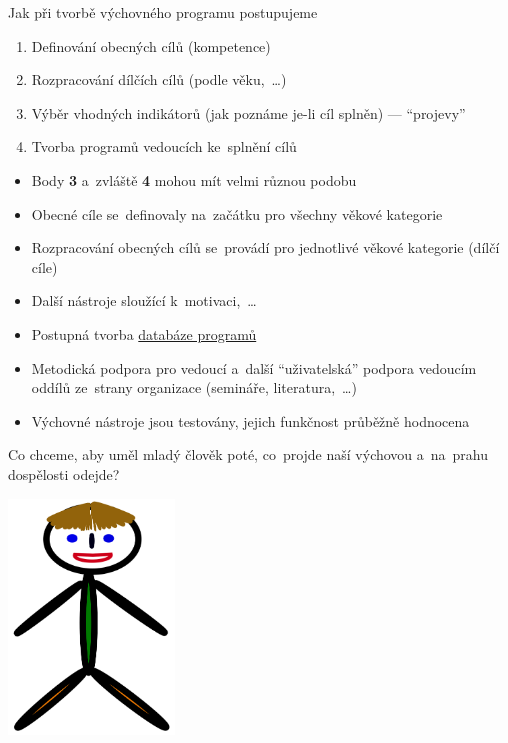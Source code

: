 \documentclass[compress, ucs, xelatex, 11pt, xcolor=dvipsnames, print, aspectratio=169,
	hyperref={
		bookmarks=true,
		unicode=true,
		colorlinks=true,
		pdftitle={Skautska vychovna metoda},
		plainpages=false,
		pdfauthor={Vojtech Zeisek},
		pdfsubject={Skautska vychovna metoda a jeji vyvoj za posledni stoleti a desetileti},
		pdfcreator={XeLaTeX},
		pdfkeywords={Junak, Pedagogika, Skaut, Skauting, Vychovna metoda},
		linkcolor=Red, %
		anchorcolor=ForestGreen, %
		citecolor=ForestGreen, %
		filecolor=ForestGreen, %
		menucolor=ForestGreen, %
		urlcolor=Sepia, %
		pdftex},
	url={hyphens, lowtilde} %
	]{beamer}
\begin{document}
\begin{frame}{Jak při tvorbě výchovného programu postupujeme}
	\begin{enumerate}
		\item Definování obecných cílů (kompetence)
		\item Rozpracování dílčích cílů (podle věku,~\ldots)
		\item Výběr vhodných indikátorů (jak poznáme je-li cíl splněn) --- \enquote{projevy}
		\item Tvorba programů vedoucích ke~splnění cílů
	\end{enumerate}
	\begin{itemize}
		\item Body \textbf{3} a~zvláště \textbf{4} mohou mít velmi různou podobu
		\item Obecné cíle se~definovaly na~začátku pro všechny věkové kategorie
		\item Rozpracování obecných cílů se~provádí pro jednotlivé věkové kategorie (dílčí cíle)
		\item Další nástroje sloužící k~motivaci,~\ldots
		\item Postupná tvorba \href{https://chystamprogram.skaut.cz/}{databáze programů}
		\item Metodická podpora pro vedoucí a~další \enquote{uživatelská} podpora vedoucím oddílů ze~strany organizace (semináře, literatura,~\ldots)
		\item Výchovné nástroje jsou testovány, jejich funkčnost průběžně hodnocena
	\end{itemize}
\end{frame}

\begin{frame}{Co chceme, aby uměl mladý člověk poté, co~projde naší výchovou a~na~prahu dospělosti odejde?}
	\begin{center}
		\includegraphics[height=6.25cm]{pepicek.png}
	\end{center}
\end{frame}
\end{document}
